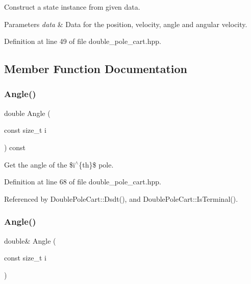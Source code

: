 Construct a state instance from given data. 


\begin{DoxyParams}{Parameters}
{\em data} & Data for the position, velocity, angle and angular velocity. \\
\hline
\end{DoxyParams}


Definition at line 49 of file double\+\_\+pole\+\_\+cart.\+hpp.



\subsection{Member Function Documentation}
\mbox{\label{classmlpack_1_1rl_1_1DoublePoleCart_1_1State_a6faedb6fad4a1761e5bc5f2c9f061131}} 
\subsubsection{Angle()\hspace{0.1cm}{\footnotesize\ttfamily [1/2]}}
{\footnotesize\ttfamily double Angle (\begin{DoxyParamCaption}\item[{const size\+\_\+t}]{i }\end{DoxyParamCaption}) const\hspace{0.3cm}{\ttfamily [inline]}}



Get the angle of the \$i$^\wedge$\{th\}\$ pole. 



Definition at line 68 of file double\+\_\+pole\+\_\+cart.\+hpp.



Referenced by Double\+Pole\+Cart\+::\+Dsdt(), and Double\+Pole\+Cart\+::\+Is\+Terminal().

\mbox{\label{classmlpack_1_1rl_1_1DoublePoleCart_1_1State_a142c4655f9f8e43ec2f0be2d0dc0b635}} 
\subsubsection{Angle()\hspace{0.1cm}{\footnotesize\ttfamily [2/2]}}
{\footnotesize\ttfamily double\& Angle (\begin{DoxyParamCaption}\item[{const size\+\_\+t}]{i }\end{DoxyParamCaption})\hspace{0.3cm}{\ttfamily [inline]}}



